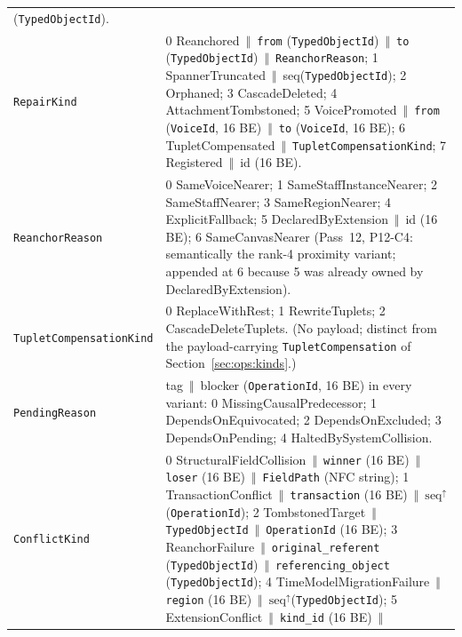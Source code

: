\documentclass[11pt,letterpaper]{report}
\newcommand{\tablenums}[1]{{\addfontfeatures{Numbers={Lining,Tabular}}#1}}
\newcommand{\cat}{\ensuremath{\,\Vert\,}}
\begin{document}
\begin{longtable}{>{\raggedright\arraybackslash}p{1.6in} p{4.1in}}
    (\texttt{TypedObjectId}). \\
  \texttt{RepairKind} &
    \tablenums{0} Reanchored \cat{} \texttt{from} (\texttt{TypedObjectId})
    \cat{} \texttt{to} (\texttt{TypedObjectId}) \cat{}
    \texttt{ReanchorReason};
    \tablenums{1} SpannerTruncated \cat{} seq(\texttt{TypedObjectId});
    \tablenums{2} Orphaned; \tablenums{3} CascadeDeleted;
    \tablenums{4} AttachmentTombstoned;
    \tablenums{5} VoicePromoted \cat{} \texttt{from} (\texttt{VoiceId},
    16 BE) \cat{} \texttt{to} (\texttt{VoiceId}, 16 BE);
    \tablenums{6} TupletCompensated \cat{} \texttt{TupletCompensationKind};
    \tablenums{7} Registered \cat{} id (16 BE). \\
  \texttt{ReanchorReason} &
    \tablenums{0} SameVoiceNearer; \tablenums{1} SameStaffInstanceNearer;
    \tablenums{2} SameStaffNearer; \tablenums{3} SameRegionNearer;
    \tablenums{4} ExplicitFallback;
    \tablenums{5} DeclaredByExtension \cat{} id (16 BE);
    \tablenums{6} SameCanvasNearer (Pass~12, P12-C4: semantically the
    rank-4 proximity variant; appended at 6 because 5 was already
    owned by DeclaredByExtension). \\
  \texttt{TupletCompensationKind} &
    \tablenums{0} ReplaceWithRest; \tablenums{1} RewriteTuplets;
    \tablenums{2} CascadeDeleteTuplets. (No payload; distinct from the
    payload-carrying \texttt{TupletCompensation} of
    Section~\ref{sec:ops:kinds}.) \\
  \texttt{PendingReason} &
    tag \cat{} blocker (\texttt{OperationId}, 16 BE) in every variant:
    \tablenums{0} MissingCausalPredecessor; \tablenums{1}
    DependsOnEquivocated; \tablenums{2} DependsOnExcluded;
    \tablenums{3} DependsOnPending; \tablenums{4} HaltedBySystemCollision. \\
  \texttt{ConflictKind} &
    \tablenums{0} StructuralFieldCollision \cat{} \texttt{winner} (16 BE)
    \cat{} \texttt{loser} (16 BE) \cat{} \texttt{FieldPath} (NFC string);
    \tablenums{1} TransactionConflict \cat{} \texttt{transaction} (16 BE)
    \cat{} $\mathrm{seq}^{\uparrow}$(\texttt{OperationId});
    \tablenums{2} TombstonedTarget \cat{} \texttt{TypedObjectId} \cat{}
    \texttt{OperationId} (16 BE);
    \tablenums{3} ReanchorFailure \cat{} \texttt{original\_referent}
    (\texttt{TypedObjectId}) \cat{} \texttt{referencing\_object}
    (\texttt{TypedObjectId});
    \tablenums{4} TimeModelMigrationFailure \cat{} \texttt{region} (16 BE)
    \cat{} $\mathrm{seq}^{\uparrow}$(\texttt{TypedObjectId});
    \tablenums{5} ExtensionConflict \cat{} \texttt{kind\_id} (16 BE) \cat{}

\end{longtable}
\end{document}
